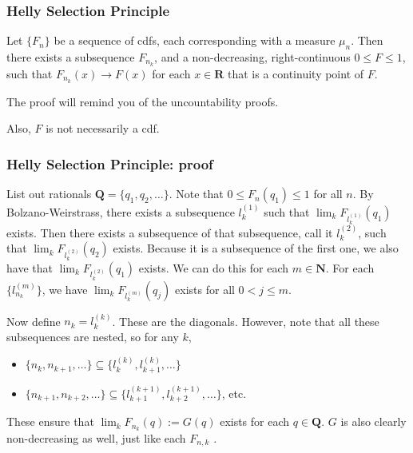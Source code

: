 \documentclass[handout]{beamer}
\begin{document}
%



\frame
{
\frametitle{Helly Selection Principle} 

\begin{Theorem} 
Let $\{F_n\}$ be a sequence of cdfs, each corresponding with a measure $\mu_n$. Then there exists a subsequence $F_{n_k}$, and a non-decreasing, right-continuous $0 \le F \le 1$, such that $F_{n_k}(x) \to F(x)$ for each $x \in \mathbf{R}$ that is a continuity point of $F$.
\end{Theorem}

The proof will remind you of the uncountability proofs. 
\newline

Also, $F$ is not necessarily a cdf.
}

\frame
{
\frametitle{Helly Selection Principle: proof} 

List out rationals $\mathbf{Q} = \{q_1, q_2,\ldots\}$. Note that $0 \le F_n(q_1) \le 1$ for all $n$. By Bolzano-Weirstrass, there exists a subsequence $l_k^{(1)}$ such that $\lim_k F_{l_k^{(1)} }(q_1)$ exists. Then there exists a subsequence of that subsequence, call it $l_k^{(2)}$, such that $\lim_k F_{l_k^{(2)} }(q_2)$ exists. Because it is a subsequence of the first one, we also have that $\lim_k F_{l_k^{(2)} }(q_1)$ exists. We can do this for each $m \in \mathbf{N}$. For each $\{l_{n_k}^{(m)} \}$, we have $\lim_k F_{l_k^{(m)} }(q_j)$ exists for all $0 < j \le m$.
\newline

Now define $n_k = l_k^{(k)}$. These are the diagonals. However, note that all these subsequences are nested, so for any $k$, 
\begin{itemize}
\item $\{n_k, n_{k+1}, \ldots\} \subseteq \{l^{(k)}_{k}, l^{(k)}_{k+1},\ldots\}  $ 
\item $\{n_{k+1}, n_{k+2}, \ldots\} \subseteq \{l^{(k+1)}_{k+1}, l^{(k+1)}_{k+2},\ldots\}  $, etc. 
\end{itemize}

These ensure that $\lim_k F_{n_k}(q) := G(q)$ exists for each $q \in \mathbf{Q}$. $G$ is also clearly non-decreasing as well, just like each $F_{n,k}$ .

}
\end{document}
